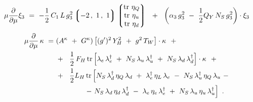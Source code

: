\documentclass[12pt]{revtex4}
\newcommand{\p}{\partial}
\begin{document}
%
\begin{equation}
\notag
	\mu \frac{\p}{\p\mu} 
	\xi_3 
	~=~
	- \frac{1}{2}\, C_1\, L\, g_3^2 
		\left\lgroup
			-2\,,~1\,,~1
		\right\rgroup
	\left\lgroup
	\begin{matrix}
		{\rm tr~}\eta_Q \\
		{\rm tr~}\eta_u \\
		{\rm tr~}\eta_d
	\end{matrix}
	\right\rgroup
	~~+~~
	\left(
		\alpha_3\, g_3^2 
		~-~
		\frac{1}{2}
		Q_Y\, N_S\, g_3^2
	\right)
	\cdot \xi_3
\end{equation}
%
\begin{align}
\notag
	\mu \frac{\p}{\p\mu} \,
	\kappa 
	~=~&
	( A^\kappa ~+~ G^\kappa )
	\left[
		(g')^2\, Y_H^2 ~+~ g^2\, T_W
	\right] \cdot \kappa
	~~+ 
	\\
\notag
	&
	+~~
	\frac{1}{2}\, F_H\, 
	{\rm tr} 
	\left[
		\lambda_e\, \lambda_e^\dag
		~+~
		N_S\, \lambda_u\, \lambda_u^\dag
		~+~
		N_S\, \lambda_d\, \lambda_d^\dag
	\right]
	\cdot \kappa
	~~+
	\\
\notag
	&
	+~~
	\frac{1}{2}
	L_H\,
	{\rm tr} 
	\left[
		N_S\, \lambda_d^\dag\, \eta_Q\, \lambda_d 
		~+~
		\lambda_e^\dag\, \eta_L\, \lambda_e
		~-~
		N_S\, \lambda_u^\dag\, \eta_Q\, \lambda_u
		~-
	\right.
	\\
\notag
	&
	\qquad\qquad
	\left.
		-~
		N_S\, \lambda_d\, \eta_d\, \lambda_d^\dag
		~-~
		\lambda_e\, \eta_e\, \lambda_e^\dag
		~+~
		N_S\, \lambda_u\, \eta_u\, \lambda_u^\dag
	\right]
	~.
\end{align}
\end{document}
